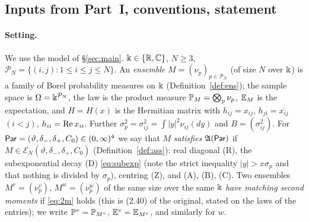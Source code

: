 \subsection{Inputs from Part~I, conventions, statement}\label{sec:inputs}

\paragraph{Setting.} We use the model of \S\ref{sec:main}. $\K\in\{\R,\C\}$, $N\ge3$, $\mathcal P_N=\{(i,j):1\le i\le j\le N\}$. An
\emph{ensemble} $M=(\nu_p)_{p\in\mathcal P_N}$ (of size $N$ over $\K$) is a family of Borel probability measures on $\K$
(Definition~\ref{def:ens}); the sample space is $\Omega=\K^{\mathcal P_N}$, the law is the product measure $\P_M=\bigotimes_p\nu_p$, $\E_M$ is the
expectation, and $H=H(x)$ is the Hermitian matrix with $h_{ij}=x_{ij}$, $h_{ji}=\overline{x_{ij}}$ $(i<j)$, $h_{ii}=\re x_{ii}$. Further
$\sigma_p^2=\sigma_{ij}^2=\int|y|^2\nu_{ij}(dy)$ and $B=(\sigma_{ij}^2)$. For $\Par=(\vartheta,\delta_-,\delta_+,C_0)\in(0,\infty)^4$ we say that
$M$ \emph{satisfies} $\fA(\Par)$ if $M\in\mathcal E_N(\vartheta,\delta_-,\delta_+,C_0)$ (Definition~\ref{def:ass}): real diagonal (R), the
subexponential decay (D) \eqref{eq:subexp} (note the strict inequality $|y|>x\sigma_p$ and
that nothing is divided by $\sigma_p$), centring (Z), and \textup{(A)}, \textup{(B)}, \textup{(C)}. Two ensembles $M^v=(\nu^v_p)$, $M^w=(\nu^w_p)$
of the same size over the same $\K$ \emph{have matching second moments} if \eqref{eq:2m} holds (this is (2.40) of the original, stated on the
laws of the entries); we write $\P^v=\P_{M^v}$, $\E^v=\E_{M^v}$, and similarly for $w$.

